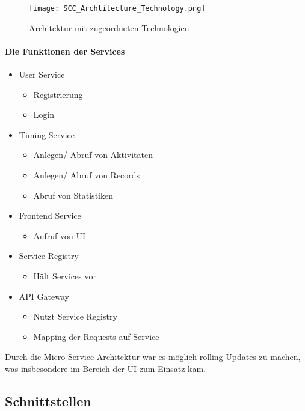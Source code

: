 \begin{figure}[H]
	\hspace{-1.5cm}
	\texttt{[image: SCC\_Archtitecture\_Technology.png]}
	\caption{Architektur mit zugeordneten Technologien}
	\label{fig:ArchitekturTech}
\end{figure}





\paragraph{Die Funktionen der Services}
\begin{itemize}
	\item User Service
	\begin{itemize}
		\item Registrierung
		\item Login
	\end{itemize}
	\item Timing Service
	\begin{itemize}
		\item Anlegen/ Abruf von Aktivitäten
		\item Anlegen/ Abruf von Records
		\item Abruf von Statistiken
	\end{itemize}
	\item Frontend Service
	\begin{itemize}
		\item Aufruf von UI
	\end{itemize}
	\item Service Registry
	\begin{itemize}
		\item Hält Services vor
	\end{itemize}
	\item API Gateway
	\begin{itemize}
		\item Nutzt Service Registry
		\item Mapping der Requests auf Service
	\end{itemize}
\end{itemize}

Durch die Micro Service Architektur war es möglich rolling Updates zu machen, was insbesondere im Bereich der UI zum Einsatz kam. 

\subsection{Schnittstellen}

